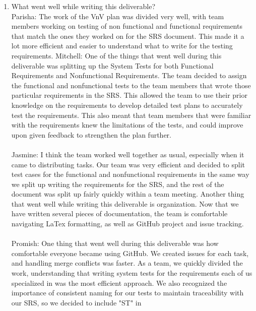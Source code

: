 \documentclass[12pt, titlepage]{article}
\begin{document}
\begin{enumerate}
  \item What went well while writing this deliverable?\\
  \newline
  \hspace{2em} Parisha: The work of the VnV plan was divided very well, 
  with team members working on testing of non functional and functional requirements that match
  the ones they worked on for the SRS document. This made it a lot more efficient and easier to understand
  what to write for the testing requirements. 
  \hspace{2em} Mitchell: One of the things that went well during this deliverable was splitting up
  the System Tests for both Functional Requirements and Nonfunctional Requirements. The team decided
  to assign the functional and nonfunctional tests to the team members that wrote those particular
  requirements in the SRS. This allowed the team to use their prior knowledge on the requirements
  to develop detailed test plans to accurately test the requirements. This also meant that team members
  that were familiar with the requirements knew the limitations of the tests, and could improve upon
  given feedback to strengthen the plan further.\\\\
  \hspace{2em} Jasmine: I think the team worked well together as usual, especially when it came to 
  distributing tasks. Our team was very efficient and decided to split test cases for the functional and 
  nonfunctional requirements in the same way we split up writing the requirements for the SRS, and the 
  rest of the document was split up fairly quickly within a team meeting. Another thing that went well 
  while writing this deliverable is organization. Now that we have written several pieces of documentation, 
  the team is comfortable navigating LaTex formatting, as well as GitHub project and issue tracking.\\\\
  \hspace{2em} Promish: One thing that went well during this deliverable was how 
  comfortable everyone became using GitHub. We created issues for each task, and 
  handling merge conflicts was faster. As a team, we quickly divided the work, 
  understanding that writing system tests for the requirements each of us specialized in 
  was the most efficient approach. We also recognized the importance of consistent naming 
  for our tests to maintain traceability with our SRS, so we decided to include "ST" in 

\end{enumerate}
\end{document}
